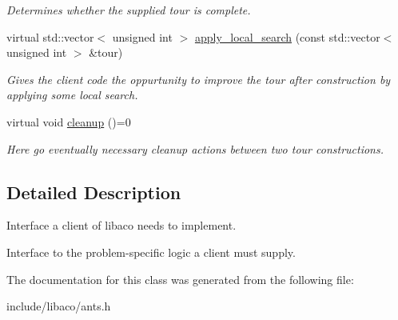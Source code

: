 \begin{CompactItemize}
\begin{CompactList}\small\item\em Determines whether the supplied tour is complete. \item\end{CompactList}\item 
\hypertarget{classOptimizationProblem_74c083b6b88c801052af5dbfa06644e0}{
virtual std::vector$<$ unsigned int $>$ \hyperlink{classOptimizationProblem_74c083b6b88c801052af5dbfa06644e0}{apply\_\-local\_\-search} (const std::vector$<$ unsigned int $>$ \&tour)}
\label{classOptimizationProblem_74c083b6b88c801052af5dbfa06644e0}

\begin{CompactList}\small\item\em Gives the client code the oppurtunity to improve the tour after construction by applying some local search. \item\end{CompactList}\item 
\hypertarget{classOptimizationProblem_78e513c392ac1c5489b598b275cfef26}{
virtual void \hyperlink{classOptimizationProblem_78e513c392ac1c5489b598b275cfef26}{cleanup} ()=0}
\label{classOptimizationProblem_78e513c392ac1c5489b598b275cfef26}

\begin{CompactList}\small\item\em Here go eventually necessary cleanup actions between two tour constructions. \item\end{CompactList}\end{CompactItemize}


\subsection{Detailed Description}
Interface a client of libaco needs to implement. 

Interface to the problem-specific logic a client must supply. 

The documentation for this class was generated from the following file:\begin{CompactItemize}
\item 
include/libaco/ants.h\end{CompactItemize}

